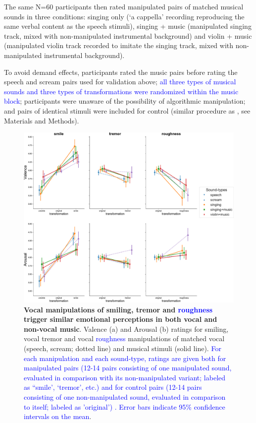 \documentclass[openacc]{rsprocb_new}%
\begin{document}
The same N=60 participants then rated manipulated pairs of matched musical sounds in three conditions: singing only (`a cappella' recording reproducing the same verbal content as the speech stimuli), singing + music (manipulated singing track, mixed with non-manipulated instrumental background) and violin + music (manipulated violin track recorded to imitate the singing track, mixed with non-manipulated instrumental background). 

To avoid demand effects, participants rated the music pairs before rating the speech and scream pairs used for validation above; \textcolor{blue}{all three types of musical sounds and three types of transformations were randomized within the music block}; participants were unaware of the possibility of algorithmic manipulation; and pairs of identical stimuli were included for control (similar procedure as \cite{MA15}, see Materials and Methods). 

\begin{figure}[htbp]
\centerline{\includegraphics[width=\textwidth]{pics/Figure_2.pdf}}
\caption{{\bf Vocal manipulations of smiling, tremor and \textcolor{blue}{roughness} trigger similar emotional perceptions in both vocal and non-vocal music}. Valence (a) and Arousal (b) ratings for smiling, vocal tremor and vocal \textcolor{blue}{roughness} manipulations of matched vocal (speech, scream; dotted line) and musical stimuli (solid line). \textcolor{blue}{For each manipulation and each sound-type, ratings are given both for manipulated pairs (12-14 pairs consisting of one manipulated sound, evaluated in comparison with its non-manipulated variant; labeled as ``smile', `tremor', etc.) and for control pairs (12-14 pairs consisting of one non-manipulated sound, evaluated in comparison to itself; labeled as 'original') . Error bars indicate 95\% confidence intervals on the mean}.}
\label{comparison}
\end{figure}
\end{document}
